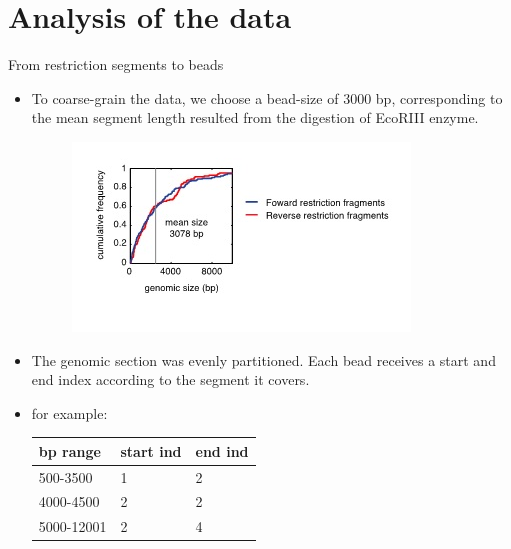 \documentclass[8pt]{beamer}
\begin{document}
\section{Analysis of the data}\label{section_analysisOfTheData}
\begin{frame}{From restriction segments to beads}
\begin{itemize}
\item To coarse-grain the data, we choose a bead-size of 3000 bp, corresponding to the mean segment length resulted from the digestion of EcoRIII enzyme. 

\begin{figure}[H]
\includegraphics[scale=0.55]{restrictionSegmentLengthDistributionLucaetal}
\end{figure}
\item The genomic section was evenly partitioned. Each bead receives a start and end index according to the segment it covers. 
\item for example: 
\begin{tabular}[H]{|l| l| l|}
\hline
bp range & start ind & end ind\\
\hline
500-3500   & 1         & 2 \\
4000-4500  & 2         & 2 \\   
5000-12001 & 2         & 4 \\       
\hline  
\end{tabular}
\end{itemize}
\end{frame}
\end{document}
